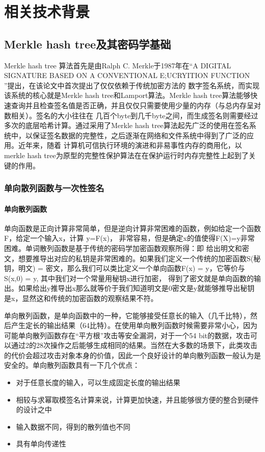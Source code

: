 
\chapter{相关技术背景}

\section{Merkle hash tree及其密码学基础}
Merkle hash tree \cite{merkle1987digital}算法首先是由Ralph C. Merkle于1987年在“A DIGITAL SIGNATURE BASED ON A CONVENTIONAL E;UCRYITION FUNCTION ”提出，在该论文中首次提出了仅仅依赖于传统加密方法的
数字签名系统，而实现该系统的核心就是Merkle hash tree和Lamport算法。Merkle hash tree算法能够快速查询并且检查签名值是否正确，并且仅仅只需要使用少量的内存（与总内存呈对数相关）。签名的大小往往在
几百个byte到几千byte之间，而生成签名则需要经过多次的底层哈希计算。通过采用了Merkle hash tree算法起先广泛的使用在签名系统中，以保证签名数据的完整性，之后逐渐在网络和文件系统中得到了广泛的应用。近年来，随着
计算机可信执行环境的演进和非易事性内存的商用化，以merkle hash tree为原型的完整性保护算法在在保护运行时内存完整性上起到了关键的作用。

\subsection{单向散列函数与一次性签名}
\subsubsection{单向散列函数}
单向函数是正向计算非常简单，但是逆向计算非常困难的函数，例如给定一个函数F，给定一个输入x，计算 y=F(x)， 非常容易，但是确定x的值使得F(X)=y非常困难。单词散列函数是基于传统的密码学加密函数观察所得：即
给出明文和密文，想要推导出对应的私钥是非常困难的。如果我们定义一个传统的加密函数S(秘钥，明文) = 密文，那么我们可以类比定义一个单向函数F(x) = y，它等价与S(x,0) = y, 其中我们对一个常量用秘钥x进行加密，
得到了密文就是单向函数的输出。如果给出y推导出x那么就等价于我们知道明文是0密文是y就能够推导出秘钥是x，显然这和传统的加密函数的观察结果不符。

单向散列函数，是单向函数中的一种，它能够接受任意长的输入（几千比特），然后产生定长的输出结果（64比特）。在使用单向散列函数时候需要非常小心，因为可能单向散列函数存在“平方根”攻击等安全漏洞，对于一个54
bit的数据，攻击可以通过2的28次操作之后能够生成相同的结果。当然在大多数的场景下，此类攻击的代价会超过攻击对象本身的价值，因此一个良好设计的单向散列函数一般认为是安全的。单向散列函数具有一下几个优点：
\begin{itemize}
    \item 对于任意长度的输入，可以生成固定长度的输出结果
    \item 相较与求幂取模签名计算来说，计算更加快速，并且能够很方便的整合到硬件的设计之中
    \item 输入数据不同，得到的散列值也不同
    \item 具有单向传递性
\end{itemize}

